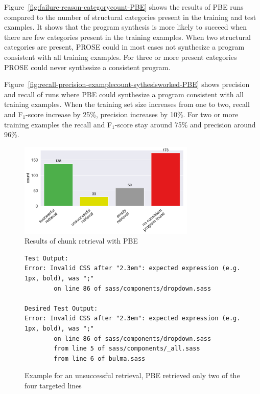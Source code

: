 \documentclass[\myrootdir/main.tex]{subfiles}
\begin{document}
Figure~\ref{fig:failure-reason-categorycount-PBE} shows the results of PBE runs compared to the number of structural categories present in the training and test examples.
It shows that the program synthesis is more likely to succeed when there are few categories present in the training examples.
When two structural categories are present, PROSE could in most cases not synthesize a program consistent with all training examples.
For three or more present categories PROSE could never synthesize a consistent program.

Figure~\ref{fig:recall-precision-examplecount-sythesisworked-PBE} shows precision and recall of runs where PBE could synthesize a program consistent with all training examples.
When the training set size increases from one to two, recall and F$_{1}$-score increase by 25\%, precision increases by 10\%.
For two or more training examples the recall and F$_{1}$-score stay around 75\% and precision around 96\%.

\begin{figure}[htbp]
		\centering
		\includegraphics[width=0.75\textwidth, clip]{img/big-study/failure-reason-PBE.pdf}
		\caption{Results of chunk retrieval with PBE}
		\label{fig:failure-reason-PBE}
\end{figure}

\begin{figure}[]
  \centering
  \begin{lstlisting}[breaklines=true]
Test Output:
Error: Invalid CSS after "2.3em": expected expression (e.g. 1px, bold), was ";"
        on line 86 of sass/components/dropdown.sass   

Desired Test Output:
Error: Invalid CSS after "2.3em": expected expression (e.g. 1px, bold), was ";"
        on line 86 of sass/components/dropdown.sass
        from line 5 of sass/components/_all.sass
        from line 6 of bulma.sass
  \end{lstlisting}  
  \caption{Example for an unsuccessful retrieval, PBE retrieved only two of the four targeted lines}
  \label{lst:pbe-unsuccessful}
\end{figure}
\end{document}
